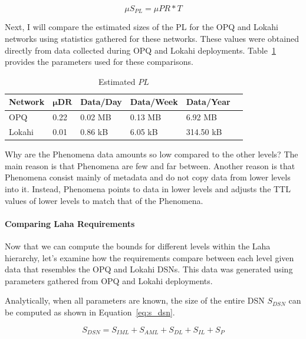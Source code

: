 \begin{equation}
	\mu S_{PL} = \mu PR * T
	\label{eq:est_pl}
\end{equation}

Next, I will compare the estimated sizes of the PL for the OPQ and Lokahi networks using statistics gathered for these networks. These values were obtained directly from data collected during OPQ and Lokahi deployments. Table~\ref{table:estimated_mu_pl} provides the parameters used for these comparisons.

\begin{table}[H]
	\centering
	\caption{Estimated $PL$}
	\begin{tabularx}{\textwidth}{llllll}
		\toprule
		\textbf{Network} & $\bm{\mu DR}$ & \textbf{Data/Day} & \textbf{Data/Week} & \textbf{Data/Year} \\
		\midrule
		OPQ & 0.22 & 0.02 MB & 0.13 MB & 6.92 MB \\
		Lokahi & 0.01 & 0.86 kB & 6.05 kB & 314.50 kB \\
		\bottomrule
	\end{tabularx}
	\label{table:estimated_mu_pl}
\end{table}

Why are the Phenomena data amounts so low compared to the other levels? The main reason is that Phenomena are few and far between. Another reason is that Phenomena consist mainly of metadata and do not copy data from lower levels into it. Instead, Phenomena points to data in lower levels and adjusts the TTL values of lower levels to match that of the Phenomena.

\paragraph{Comparing Laha Requirements}

Now that we can compute the bounds for different levels within the Laha hierarchy, let's examine how the requirements compare between each level given data that resembles the OPQ and Lokahi DSNs. This data was generated using parameters gathered from OPQ and Lokahi deployments.

Analytically, when all parameters are known, the size of the entire DSN $S_{DSN}$ can be computed as shown in Equation~\ref{eq:s_dsn}.

\begin{equation}\label{eq:s_dsn}
	S_{DSN} = S_{IML} + S_{AML} + S_{DL} + S_{IL} + S_{P}
\end{equation}


